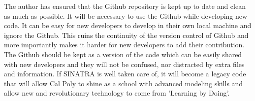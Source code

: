 \indent The author has ensured that the Github repository is kept up to date and clean as much as possible. It will be necessary to use the Github while developing new code. It can be easy for new developers to develop in their own local machine and ignore the Github. This ruins the continuity of the version control of Github and more importantly makes it harder for new developers to add their contribution. The Github should be kept as a version of the code which can be easily shared with new developers and they will not be confused, nor distracted by extra files and information. If SINATRA is well taken care of, it will become a legacy code that will allow Cal Poly to shine as a school with advanced modeling skills and allow new and revolutionary technology to come from ’Learning by Doing’.




